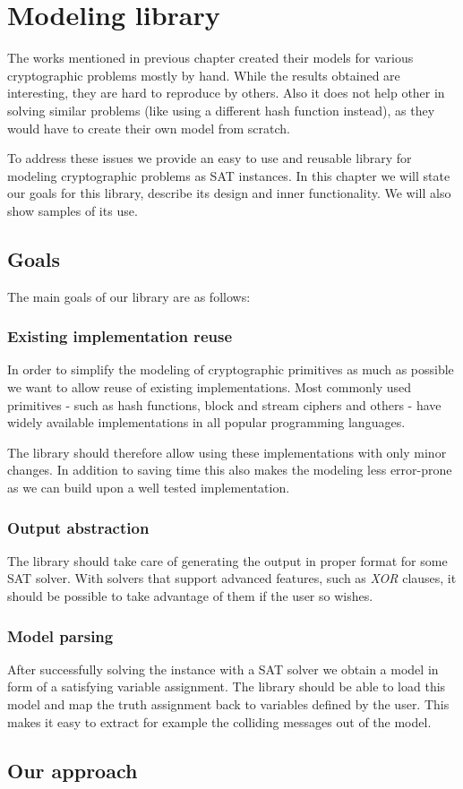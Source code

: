 \chapter{Modeling library}

The works mentioned in previous chapter created their models for various cryptographic problems mostly by hand.
While the results obtained are interesting, they are hard to reproduce by others.
Also it does not help other in solving similar problems (like using a different hash function instead), as they would have to create their own model from scratch.

To address these issues we provide an easy to use and reusable library for modeling cryptographic problems as SAT instances.
In this chapter we will state our goals for this library, describe its design and inner functionality.
We will also show samples of its use.

\section{Goals}

The main goals of our library are as follows:

\subsection{Existing implementation reuse}
In order to simplify the modeling of cryptographic primitives as much as possible we want to allow reuse of existing implementations.
Most commonly used primitives - such as hash functions, block and stream ciphers and others - have widely available implementations in all popular programming languages.

The library should therefore allow using these implementations with only minor changes.
In addition to saving time this also makes the modeling less error-prone as we can build upon a well tested implementation.

\subsection{Output abstraction}
The library should take care of generating the output in proper format for some SAT solver.
With solvers that support advanced features, such as \emph{XOR} clauses, it should be possible to take advantage of them if the user so wishes.

\subsection{Model parsing}
After successfully solving the instance with a SAT solver we obtain a model in form of a satisfying variable assignment.
The library should be able to load this model and map the truth assignment back to variables defined by the user.
This makes it easy to extract for example the colliding messages out of the model.

\section{Our approach}
